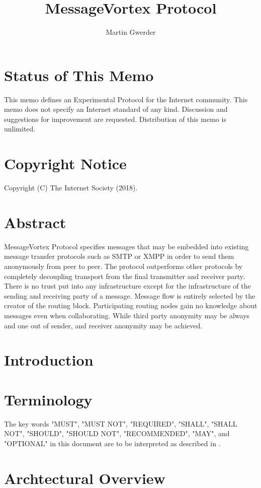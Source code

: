 \documentclass[]{article}
\title{MessageVortex Protocol}
\author{Martin Gwerder}
\begin{document}
\maketitle


\section*{Status of This Memo}
This memo defines an Experimental Protocol for the Internet community.  This memo does not specify an Internet standard of any kind.  Discussion and suggestions for improvement are requested. Distribution of this memo is unlimited.


\section*{Copyright Notice}
Copyright (C) The Internet Society (2018).

\section*{Abstract}
MessageVortex Protocol specifies messages that may be embedded into existing message transfer protocols such as SMTP or XMPP in order to send them anonymously from peer to peer. The protocol outperforms other protocols by completely decoupling transport from the final transmitter and receiver party. There is no trust  put into any infrastructure except for the infrastructure of the sending and receiving party of a message. Message flow is entirely selected by the creator of the routing block. Participating routing nodes gain no knowledge about messages even when collaborating. While third party anonymity may be always and one out of sender, and receiver anonymity may be achieved.

\newpage
\tableofcontents

\section{Introduction}

\section{Terminology}
The key words "MUST", "MUST NOT", "REQUIRED", "SHALL", "SHALL NOT", "SHOULD", "SHOULD NOT", "RECOMMENDED", "MAY", and "OPTIONAL" in this document are to be interpreted as described in \cite{RFC2119}.

\section{Archtectural Overview}
\end{document}
